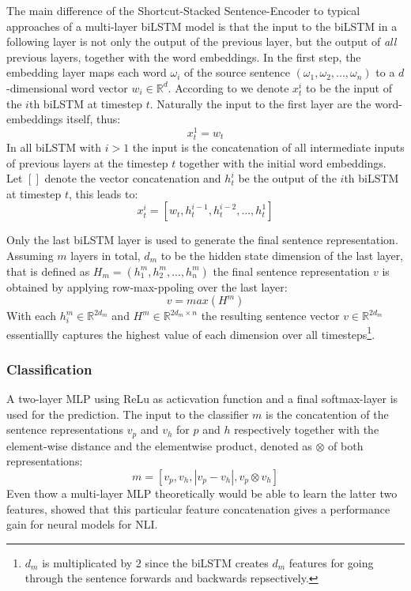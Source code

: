 The main difference of the Shortcut-Stacked Sentence-Encoder to typical approaches of a multi-layer \ac{biLSTM} model is that the input to the \ac{biLSTM} in a following layer is not only the output of the previous layer, but the output of \textit{all} previous layers, together with the word embeddings. In the first step, the embedding layer maps each word $\omega_i$ of the source sentence $(\omega_1, \omega_2, ..., \omega_n)$ to a $d$-dimensional word vector $w_i \in \mathbb{R}^d$. According to \cite{nie2017shortcut} we denote $x_t^i$ to be the input of the $i$th \ac{biLSTM} at timestep $t$. Naturally the input to the first layer are the word-embeddings itself, thus:
\begin{equation}
x_t^1 = w_t
\end{equation} 
In all \ac{biLSTM} with $i > 1$ the input is the concatenation of all intermediate inputs of previous layers at the timestep $t$ together with the initial word embeddings. Let $[]$ denote the vector concatenation and $h^i_t$ be the output of the $i$th \ac{biLSTM} at timestep $t$, this leads to:
\begin{equation}\label{eq:stacked_encoder_input}
x_t^i = [w_t, h_t^{i-1}, h_t^{i-2}, ... , h_t^1]
\end{equation}

Only the last \ac{biLSTM} layer is used to generate the final sentence representation. Assuming $m$ layers in total, $d_m$ to be the hidden state dimension of the last layer, that is defined as $H_m=(h_1^m, h_2^m, ..., h_n^m)$ the final sentence representation $v$ is obtained by applying row-max-ppoling over the last layer:
\begin{equation}
v = max(H^m)
\end{equation}
With each $h_i^m \in \mathbb{R}^{2d_m}$ and $H^m \in \mathbb{R}^{2d_m \times n}$ the resulting sentence vector $v \in \mathbb{R}^{2d_m}$ essentiallly captures the highest value of each dimension over all timesteps\footnote{$d_m$ is multiplicated by $2$ since the \ac{biLSTM} creates $d_m$ features for going through the sentence forwards and backwards repsectively.}.
\subsubsection{Classification}
A two-layer \ac{MLP} using ReLu as acticvation function and a final softmax-layer is used for the prediction. The input to the classifier $m$ is the concatention of the sentence representations $v_p$ and $v_h$ for $p$ and $h$ respectively together with the element-wise distance and the elementwise product, denoted as $\otimes$ of both representations:
\begin{equation}
m = [v_p, v_h, |v_p-v_h|, v_p \otimes v_h]
\end{equation}
Even thow a multi-layer \ac{MLP} theoretically would be able to learn the latter two features, \cite{mou2015natural} showed that this particular feature concatenation gives a performance gain for neural models for \ac{NLI}.
